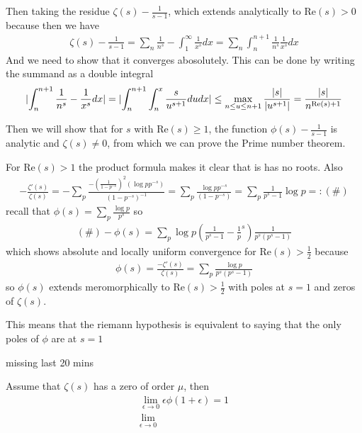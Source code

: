 Then taking the residue $\zeta(s) - \frac{1}{s - 1}$, which extends analytically to $\text{Re}(s) > 0$ because then we have
\begin{align*}
	\zeta(s) - \frac{1}{s-1} 
	= 
	\sum_{n}\frac{1}{n^{s}} - \int_{1}^{\infty} \frac{1}{x^{s}}dx 
	= 
	\sum_{n}\int_{n}^{n+1} \frac{1}{n^{s}}\frac{1}{x^{s}}dx
\end{align*}
And we need to show that it converges abosolutely. This can be done by writing the summand as a double integral
\begin{align*}
	\abs{\int_{n}^{n+1}\frac{1}{n^{s}} - \frac{1}{x^{s}}dx} 
	= 
	\abs{\int_{n}^{n+1} \int_{n}^{x} \frac{s}{u^{s+1}}du dx} 
	\leq 
	\max_{n\leq u \leq n+1} \frac{\abs{s}}{\abs{u^{s+1}}} = \frac{\abs{s}}{n^{\text{Re}(s) + 1}}
\end{align*}

Then we will show that 
for $s$ with $\text{Re}(s) \geq 1$, the function $\phi(s) - \frac{1}{s-1}$ is analytic and $\zeta(s) \neq 0$, from which we can prove the Prime number theorem.


For $\text{Re}(s) > 1$ the product formula makes it clear that is has no roots. Also
\begin{align*}
	- \frac{\zeta'(s)}{\zeta(s)} = - \sum_{p} \frac{-\left(
		\frac{1}{1-p^{-s}}
\right)^{2}\left(
	\log p p^{-s}
\right)}{\left(
	1 - p^{-s}
\right)^{-1}} = \sum_{p} \frac{\log p p^{-s}}{(1 - p^{-s})} = \sum_{p} \frac{1}{p^{s} - 1} \log p =: (\#)
\end{align*}
recall that $\phi(s) = \sum_{p} \frac{\log p}{p^{s}}$ so
\begin{align*}
	(\#) - \phi(s) = \sum_{p} \log p \left(
		\frac{1}{p^{s} - 1} - \frac{1}{p}^{s}
	\right)\frac{1}{p^{s}(p^{s}-1)}
\end{align*}
which shows absolute and locally uniform convergence for $\text{Re}(s) > \frac{1}{2}$ because
\begin{align*}
	\phi(s) = \frac{-\zeta'(s)}{\zeta(s)} = \sum_{p} \frac{\log p }{p^{s}(p^{s}-1)}
\end{align*}
so $\phi(s)$ extends meromorphically to $\text{Re}(s) > \frac{1}{2}$ with poles at $s = 1$ and zeros of $\zeta(s)$.

This means that the riemann hypothesis is equivalent to saying that the only poles of $\phi$ are at $s = 1$


\begin{center}
	missing last 20 mins
\end{center}
Assume that $\zeta(s)$ has a zero of order $\mu$, then
\begin{align*}
	\lim_{\epsilon \to 0}\epsilon \phi(1 + \epsilon) = 1\\
	\lim_{\epsilon \to 0}
\end{align*}

